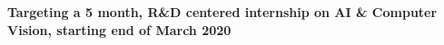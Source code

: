 %
%
%
\par{\begin{center}
    
    \textbf{Targeting a 5 month, R\&D centered internship on AI \& Computer Vision, starting end of March 2020}
    
\end{center}

}